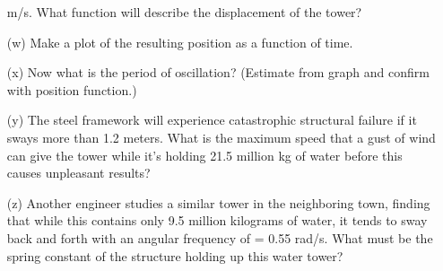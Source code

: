 \begin{problem}
\begin{enumerate}
            m/s.  What function will describe the displacement of the tower?
        \item[(w)] Make a plot of the resulting position as a function of time.
        \item[(x)] Now what is the period of oscillation?  (Estimate from graph and confirm
            with position function.)
        \item[(y)] The steel framework will experience catastrophic structural failure if it
            sways more than 1.2 meters.  What is the maximum speed that a gust of wind can
            give the tower while it's holding 21.5 million kg of water before this causes
            unpleasant results?
        \item[(z)] Another engineer studies a similar tower in the neighboring town, finding that
            while this contains only 9.5 million kilograms of water, it tends to sway back
            and forth with an angular frequency of  = 0.55 rad/s.  What must be the spring
            constant of the structure holding up this water tower?
    \end{enumerate}
\end{problem}


